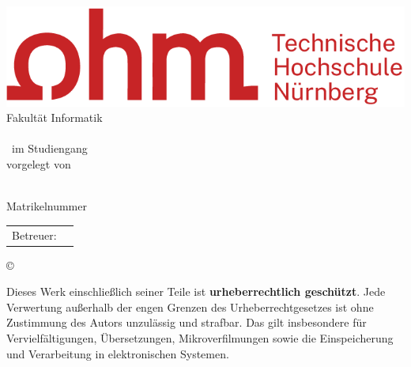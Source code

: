 \thispagestyle{empty}
\begin{titlepage}

	\begin{center}

		\includegraphics[width=\linewidth]{figures/ohm-logo.png}\\[1cm]
		\LARGE{Fakultät Informatik}\\[2cm]

		\huge
		\textbf{\titel}\\[1cm]
		\Large
		\artderarbeit~im Studiengang \studiengang\\[1cm]
		\large
		vorgelegt von

		\Large
		\autor\\[0.5cm]
		\small
		Matrikelnummer \matrikelnr\\[2cm]

		\vspace*{\fill}

		\large
		\begin{tabular}{p{3cm}p{8cm}}              \\
			Betreuer: & \quad \betreuer \\
		\end{tabular}
	\end{center}

	\begin{center}
		\copyright\,\the\year
	\end{center}

	\vspace{-0.5cm}
	\singlespacing
	\small
	\noindent Dieses Werk einschließlich seiner Teile ist \textbf{urheberrechtlich geschützt}.
	Jede Verwertung außerhalb der engen Grenzen des Urheberrechtgesetzes ist ohne Zustimmung des Autors unzulässig und strafbar.
	Das gilt insbesondere für Vervielfältigungen, Übersetzungen, Mikroverfilmungen sowie die Einspeicherung und Verarbeitung in elektronischen Systemen.

\end{titlepage}
